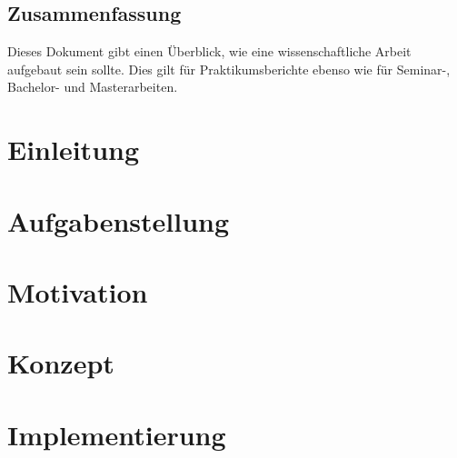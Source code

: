 \documentclass[a4paper,
               final,
               draft,
               11pt]{book}
\begin{document}


\clearpage
\newpage

\section*{\centering Zusammenfassung}

Dieses Dokument gibt einen Überblick, wie eine wissenschaftliche Arbeit aufgebaut sein sollte. Dies gilt für Praktikumsberichte ebenso wie für Seminar-, Bachelor- und Masterarbeiten.



\tableofcontents            \clearpage{\pagestyle{empty}\cleardoublepage}
\mainmatter	%
\acresetall

\chapter{Einleitung}


\chapter{Aufgabenstellung}


\chapter{Motivation}


\chapter{Konzept}


\chapter{Implementierung}

\end{document}
